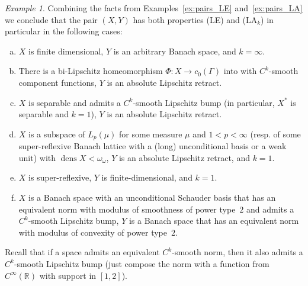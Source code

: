 \documentclass[a4paper,twoside,10pt,reqno,draft]{amsart}
\theoremstyle{definition}
\theoremstyle{remark}
\newtheorem{example}[theorem]{Example}
\newcommand\Ga{\Gamma}
\newcommand\om{\omega}
\newcommand\R{{\mathbb R}}
\DeclareMathOperator{\dens}{dens}
\newcommand\pLA[1]{(LA$_#1$)}
\newcommand\pLE{(LE)}
\begin{document}
\begin{example}\label{ex:XY_examples}
Combining the facts from Examples~\ref{ex:pairs_LE} and~\ref{ex:pairs_LA} we conclude that the pair $(X,Y)$ has both properties {\pLE} and \pLA k in particular in the following cases:
\begin{enumerate}[(a)]
\item $X$ is finite dimensional, $Y$ is an arbitrary Banach space, and $k=\infty$.
\item There is a bi-Lipschitz homeomorphism $\Phi\colon X\to c_0(\Ga)$ into with $C^k$-smooth component functions, $Y$ is an absolute Lipschitz retract.
\item $X$ is separable and admits a $C^k$-smooth Lipschitz bump (in particular, $X^*$ is separable and $k=1$), $Y$ is an absolute Lipschitz retract.
\item
$X$ is a subspace of $L_p(\mu)$ for some measure $\mu$ and $1<p<\infty$ (resp. of some super-reflexive Banach lattice with a (long) unconditional basis or a weak unit) with $\dens X<\om_\om$,
$Y$ is an absolute Lipschitz retract, and $k=1$.
\item $X$ is super-reflexive, $Y$ is finite-dimensional, and $k=1$.
\item $X$ is a Banach space with an unconditional Schauder basis that has an equivalent norm with modulus of smoothness of power type~$2$ and admits a $C^k$-smooth Lipschitz bump,
$Y$ is a Banach space that has an equivalent norm with modulus of convexity of power type~$2$.
\end{enumerate}

Recall that if a space admits an equivalent $C^k$-smooth norm, then it also admits a $C^k$-smooth Lipschitz bump (just compose the norm with a function from $C^\infty(\R)$ with support in $[1,2]$).


\end{example}
\end{document}
